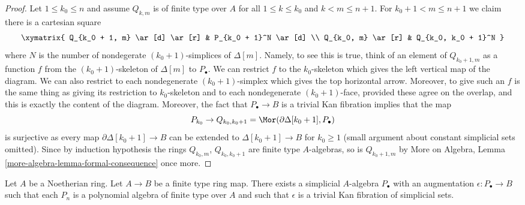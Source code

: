 \begin{proof}
\medskip\noindent
Let $1 \leq k_0 \leq n$ and assume $Q_{k, m}$ is of finite type
over $A$ for all $1 \leq k \leq k_0$ and $k < m \leq n + 1$.
For $k_0 + 1 < m \leq n + 1$ we claim there is a cartesian square
$$
\xymatrix{
Q_{k_0 + 1, m} \ar[d] \ar[r] & P_{k_0 + 1}^N \ar[d] \\
Q_{k_0, m} \ar[r] & Q_{k_0, k_0 + 1}^N
}
$$
where $N$ is the number of nondegerate $(k_0 + 1)$-simplices
of $\Delta[m]$. Namely, to see this is true, think of an element of
$Q_{k_0 + 1, m}$ as a function $f$ from the $(k_0 + 1)$-skeleton
of $\Delta[m]$ to $P_\bullet$. We can restrict $f$ to the $k_0$-skeleton
which gives the left vertical map of the diagram. We can also restrict
to each nondegenerate $(k_0 + 1)$-simplex which gives the top horizontal
arrow. Moreover, to give such an $f$ is the same thing as giving its
restriction to $k_0$-skeleton and to each nondegenerate
$(k_0 + 1)$-face, provided these agree on the overlap, and this
is exactly the content of the diagram. Moreover, the fact that
$P_\bullet \to B$ is a trivial Kan fibration implies that
the map
$$
P_{k_0} \to Q_{k_0, k_0 + 1} = \Mor(\partial \Delta[k_0 + 1], P_\bullet)
$$
is surjective as every map $\partial \Delta[k_0 + 1] \to B$ can be extended
to $\Delta[k_0 + 1] \to B$ for $k_0 \geq 1$ (small argument about constant
simplicial sets omitted). Since by induction hypothesis the rings
$Q_{k_0, m}$, $Q_{k_0, k_0 + 1}$ are finite type $A$-algebras, so is
$Q_{k_0 + 1, m}$ by
More on Algebra, Lemma \ref{more-algebra-lemma-formal-consequence}
once more.
\end{proof}

\begin{proposition}
\label{proposition-polynomial}
Let $A$ be a Noetherian ring. Let $A \to B$ be a finite type ring map.
There exists a simplicial $A$-algebra $P_\bullet$ with an augmentation
$\epsilon : P_\bullet \to B$ such that each $P_n$ is a polynomial algebra
of finite type over $A$ and such that $\epsilon$ is a trivial
Kan fibration of simplicial sets.
\end{proposition}

